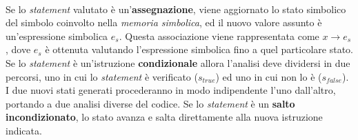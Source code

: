 \documentclass[Lau, oneside]{sapthesis}%
\begin{document}
\ \\
Se lo \textit{statement} valutato è un'\textbf{assegnazione}, viene aggiornato lo stato simbolico del simbolo coinvolto nella \textit{memoria simbolica}, ed il nuovo valore assunto è un'espressione simbolica $e_{s}$.
\newline
Questa associazione viene rappresentata come $x \rightarrow e_s$, dove $e_s$ è ottenuta valutando l'espressione simbolica fino a quel particolare stato.
\newline \newline
Se lo \textit{statement} è un'istruzione \textbf{condizionale} allora l'analisi deve dividersi in due percorsi, uno in cui lo \textit{statement} è verificato ($s_{true}$) ed uno in cui non lo è ($s_{false}$).
\newline
I due nuovi stati generati procederanno in modo indipendente l'uno dall'altro, portando a due analisi diverse del codice.
\newline \newline
Se lo \textit{statement} è un \textbf{salto incondizionato}, lo stato avanza e salta direttamente alla nuova istruzione indicata.
\end{document}
